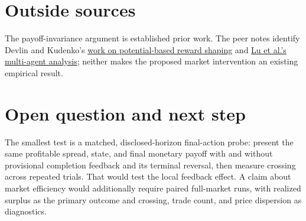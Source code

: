 \documentclass{article}
\begin{document}
\section{Outside sources}

The payoff-invariance argument is established prior work. The peer notes identify Devlin and Kudenko's \href{https://pure.york.ac.uk/portal/en/publications/theoretical-considerations-of-potential-based-reward-shaping-for-/}{work on potential-based reward shaping} and \href{https://arxiv.org/abs/1401.3907}{Lu et al.'s multi-agent analysis}; neither makes the proposed market intervention an existing empirical result. 

\section{Open question and next step}

The smallest test is a matched, disclosed-horizon final-action probe: present the same profitable spread, state, and final monetary payoff with and without provisional completion feedback and its terminal reversal, then measure crossing across repeated trials. That would test the local feedback effect. A claim about market efficiency would additionally require paired full-market runs, with realized surplus as the primary outcome and crossing, trade count, and price dispersion as diagnostics. 
\end{document}
